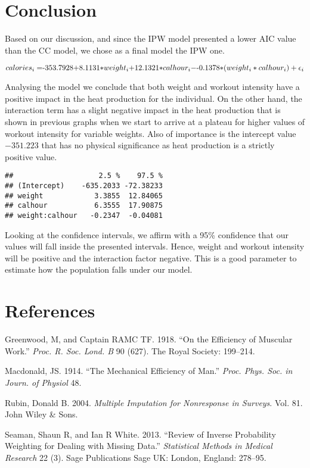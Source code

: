 \documentclass[]{article}
\theoremstyle{definition}
\theoremstyle{definition}
\theoremstyle{definition}
\theoremstyle{remark}
\begin{document}
\section{Conclusion}\label{conclusion}

Based on our discussion, and since the IPW model presented a lower AIC
value than the CC model, we chose as a final model the IPW one.

\[
calories_i = $-353.7928$  + $8.1131$*weight_i + $12.1321$*calhour_i - $-0.1378$*(weight_i*calhour_i) + \epsilon_i
\]

Analysing the model we conclude that both weight and workout intensity
have a positive impact in the heat production for the individual. On the
other hand, the interaction term has a slight negative impact in the
heat production that is shown in previous graphs when we start to arrive
at a plateau for higher values of workout intensity for variable
weights. Also of importance is the intercept value \(-351.223\) that has
no physical significance as heat production is a strictly positive
value.

\begin{verbatim}
##                    2.5 %    97.5 %
## (Intercept)    -635.2033 -72.38233
## weight            3.3855  12.84065
## calhour           6.3555  17.90875
## weight:calhour   -0.2347  -0.04081
\end{verbatim}

Looking at the confidence intervals, we affirm with a 95\% confidence
that our values will fall inside the presented intervals. Hence, weight
and workout intensity will be positive and the interaction factor
negative. This is a good parameter to estimate how the population falls
under our model.

\section*{References}\label{references}

\hypertarget{refs}{}
\hypertarget{ref-greenwood1918efficiency}{}
Greenwood, M, and Captain RAMC TF. 1918. ``On the Efficiency of Muscular
Work.'' \emph{Proc. R. Soc. Lond. B} 90 (627). The Royal Society:
199--214.

\hypertarget{ref-macdonald1914mechanical}{}
Macdonald, JS. 1914. ``The Mechanical Efficiency of Man.'' \emph{Proc.
Phys. Soc. in Journ. of Physiol} 48.

\hypertarget{ref-rubin2004multiple}{}
Rubin, Donald B. 2004. \emph{Multiple Imputation for Nonresponse in
Surveys}. Vol. 81. John Wiley \& Sons.

\hypertarget{ref-seaman2013review}{}
Seaman, Shaun R, and Ian R White. 2013. ``Review of Inverse Probability
Weighting for Dealing with Missing Data.'' \emph{Statistical Methods in
Medical Research} 22 (3). Sage Publications Sage UK: London, England:
278--95.
\end{document}
